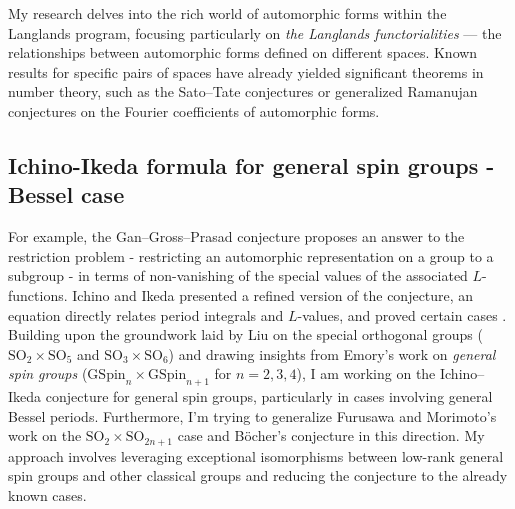 \documentclass[12pt]{article}
\begin{document}
My research delves into the rich world of automorphic forms within the Langlands program, focusing particularly on \emph{the Langlands functorialities} — the relationships between automorphic forms defined on different spaces.
Known results for specific pairs of spaces have already yielded significant theorems in number theory, such as the Sato--Tate conjectures \cite{harris2010family,barnet2011family} or generalized Ramanujan conjectures \cite{sarnak2005notes} on the Fourier coefficients of automorphic forms.


\subsection*{Ichino-Ikeda formula for general spin groups - Bessel case}


For example, the Gan--Gross--Prasad conjecture \cite{gan2011symplectic} proposes an answer to the restriction problem - restricting an automorphic representation on a group to a subgroup - in terms of non-vanishing of the special values of the  associated $L$-functions. 
Ichino and Ikeda presented a refined version of the conjecture, an equation directly relates period integrals and $L$-values, and proved certain cases \cite{ichino2010periods}. 
Building upon the groundwork laid by Liu \cite{liu2016refined} on the special orthogonal groups ($\mathrm{SO}_{2} \times \mathrm{SO}_{5}$ and $\mathrm{SO}_{3} \times \mathrm{SO}_{6}$) and drawing insights from Emory's work \cite{emory2020global} on \emph{general spin groups} ($\mathrm{GSpin}_{n} \times \mathrm{GSpin}_{n+1}$ for $n = 2, 3, 4$), I am working on the Ichino--Ikeda conjecture for general spin groups, particularly in cases involving general Bessel periods.
Furthermore, I'm trying to generalize Furusawa and Morimoto's work on the $\mathrm{SO}_{2} \times \mathrm{SO}_{2n+1}$ case and B\"ocher's conjecture \cite{furusawa2020refined} in this direction.
My approach involves leveraging exceptional isomorphisms between low-rank general spin groups and other classical groups and reducing the conjecture to the already known cases.
\end{document}
